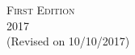 \begin{center}
\begin{minipage}{0.8\textwidth}

    \begin{minipage}[t]{0.4\textwidth}
    \begin{center}
      \textsc{First Edition} \\
      2017 \\
      (Revised on 10/10/2017) \\
      \end{center}
    \end{minipage}
    \hfill
  \end{minipage}

\end{center}
